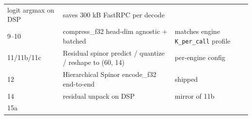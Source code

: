 \documentclass[
  11pt,
]{article}
\begin{document}
\begin{longtable}[]{@{}lll@{}}
\begin{minipage}[t]{0.26\columnwidth}
logit argmax on DSP\strut
\end{minipage} & \begin{minipage}[t]{0.30\columnwidth}\raggedright
saves 300 kB FastRPC per decode\strut
\end{minipage}\tabularnewline
\begin{minipage}[t]{0.35\columnwidth}\raggedright
9--10\strut
\end{minipage} & \begin{minipage}[t]{0.26\columnwidth}\raggedright
compress\_f32 head-dim agnostic + batched\strut
\end{minipage} & \begin{minipage}[t]{0.30\columnwidth}\raggedright
matches engine \texttt{K\_per\_call} profile\strut
\end{minipage}\tabularnewline
\begin{minipage}[t]{0.35\columnwidth}\raggedright
11/11b/11c\strut
\end{minipage} & \begin{minipage}[t]{0.26\columnwidth}\raggedright
Residual spinor predict / quantize / reshape to (60, 14)\strut
\end{minipage} & \begin{minipage}[t]{0.30\columnwidth}\raggedright
per-engine config\strut
\end{minipage}\tabularnewline
\begin{minipage}[t]{0.35\columnwidth}\raggedright
12\strut
\end{minipage} & \begin{minipage}[t]{0.26\columnwidth}\raggedright
Hierarchical Spinor encode\_f32 end-to-end\strut
\end{minipage} & \begin{minipage}[t]{0.30\columnwidth}\raggedright
shipped\strut
\end{minipage}\tabularnewline
\begin{minipage}[t]{0.35\columnwidth}\raggedright
14\strut
\end{minipage} & \begin{minipage}[t]{0.26\columnwidth}\raggedright
residual unpack on DSP\strut
\end{minipage} & \begin{minipage}[t]{0.30\columnwidth}\raggedright
mirror of 11b\strut
\end{minipage}\tabularnewline
\begin{minipage}[t]{0.35\columnwidth}\raggedright
15a\strut
\end{minipage} & \begin{minipage}[t]{0.26\columnwidth}\raggedright

\end{minipage}
\end{longtable}
\end{document}
